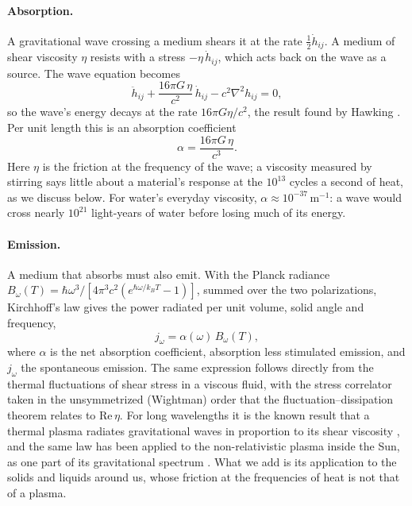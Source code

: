 \paragraph{Absorption.} A gravitational wave crossing a medium shears it at
the rate $\tfrac{1}{2}\dot h_{ij}$. A medium of shear viscosity $\eta$ resists
with a stress $-\eta\,\dot h_{ij}$, which acts back on the wave as a source.
The wave equation becomes
\begin{equation}\label{eq:damped}
\ddot h_{ij} + \frac{16\pi G\,\eta}{c^{2}}\,\dot h_{ij} - c^{2}\nabla^{2} h_{ij} = 0 ,
\end{equation}
so the wave's energy decays at the rate $16\pi G\eta/c^{2}$, the result found
by Hawking \cite{Hawking1966}. Per unit length this is an absorption
coefficient
\begin{equation}\label{eq:alpha}
\alpha = \frac{16\pi G\,\eta}{c^{3}} .
\end{equation}
Here $\eta$ is the friction at the frequency of the wave; a viscosity measured
by stirring says little about a material's response at the $10^{13}$ cycles a
second of heat, as we discuss below. For water's everyday viscosity,
$\alpha \approx 10^{-37}\,\mathrm{m^{-1}}$: a wave would cross nearly
$10^{21}$ light-years of water before losing much of its energy.

\paragraph{Emission.} A medium that absorbs must also emit. With the Planck
radiance $B_\omega(T) = \hbar\omega^3/[4\pi^3c^2(e^{\hbar\omega/k_BT} - 1)]$,
summed over the two polarizations, Kirchhoff's law gives the power radiated per
unit volume, solid angle and frequency,
\begin{equation}\label{eq:kirchhoff}
j_\omega = \alpha(\omega)\, B_\omega(T) ,
\end{equation}
where $\alpha$ is the net absorption coefficient, absorption less stimulated
emission, and $j_\omega$ the spontaneous emission. The same expression
follows directly from the thermal fluctuations of shear stress in a viscous
fluid, with the stress correlator taken in the unsymmetrized (Wightman) order
that the fluctuation--dissipation theorem relates to $\mathrm{Re}\,\eta$. For
long wavelengths it is the known result
that a thermal plasma radiates gravitational waves in proportion to its shear
viscosity \cite{GhiglieriLaine2015}, and the same law has been applied to the
non-relativistic plasma inside the Sun, as one part of its gravitational
spectrum \cite{GarciaCelyRingwald2025}. What we add is its application to the
solids and liquids around us, whose friction at the frequencies of heat is
not that of a plasma.

